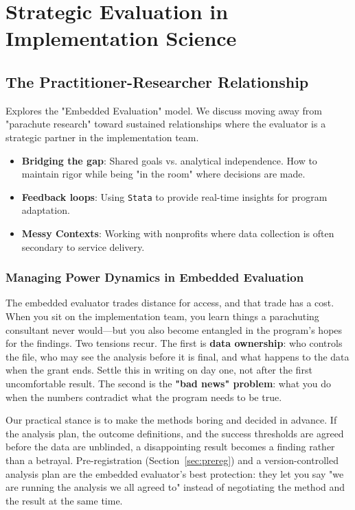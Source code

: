 \documentclass[
    a4paper,
    fontsize=10pt,
    twoside=true,
    numbers=noenddot,
]{kaobook}
\providecommand{\Environment}[1]{\texttt{#1}}
\begin{document}

\chapter{Strategic Evaluation in Implementation Science}
\section{The Practitioner-Researcher Relationship}
Explores the "Embedded Evaluation" model. We discuss moving away from "parachute research" toward sustained relationships where the evaluator is a strategic partner in the implementation team.
\begin{itemize}
    \item \textbf{Bridging the gap}: Shared goals vs. analytical independence. How to maintain rigor while being "in the room" where decisions are made.
    \item \textbf{Feedback loops}: Using \Environment{Stata} to provide real-time insights for program adaptation.
    \item \textbf{Messy Contexts}: Working with nonprofits where data collection is often secondary to service delivery.
\end{itemize}

\subsection{Managing Power Dynamics in Embedded Evaluation}\label{sec:badnews}
The embedded evaluator trades distance for access, and that trade has a cost. When you sit on the implementation team, you learn things a parachuting consultant never would---but you also become entangled in the program's hopes for the findings. Two tensions recur. The first is \textbf{data ownership}: who controls the file, who may see the analysis before it is final, and what happens to the data when the grant ends. Settle this in writing on day one, not after the first uncomfortable result. The second is the \textbf{"bad news" problem}: what you do when the numbers contradict what the program needs to be true.

Our practical stance is to make the methods boring and decided in advance. If the analysis plan, the outcome definitions, and the success thresholds are agreed before the data are unblinded, a disappointing result becomes a finding rather than a betrayal. Pre-registration (Section~\ref{sec:prereg}) and a version-controlled analysis plan are the embedded evaluator's best protection: they let you say "we are running the analysis we all agreed to" instead of negotiating the method and the result at the same time.
\end{document}
